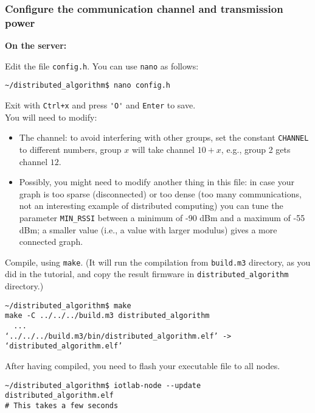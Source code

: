 \documentclass[oneside]{article}
\begin{document}
\subsubsection{Configure the communication channel and transmission power}
\label{subsec:config.h}

\textbf{On the server:}

Edit the file  \verb=config.h=. 
You can use \verb=nano= as follows:
    \begin{verbatim}~/distributed_algorithm$ nano config.h \end{verbatim}
Exit with \verb=Ctrl+x= and  press \verb='O'= and \verb=Enter= to save.\\
    
You will need to modify:
		\begin{itemize}
		\item The channel: to avoid interfering with other groups, set the
            constant \verb=CHANNEL= to different numbers, group $x$ will 					take channel $10+x$, e.g., group 2 gets channel $12$.
		\item Possibly, you might  need to modify another thing in this file:
		in case your graph is too sparse (disconnected) 
		or too dense (too many communications, 
		not an interesting example of distributed computing)
		you can tune the parameter \verb=MIN_RSSI=
		between a minimum of -90 dBm and a maximum of -55 dBm; 
		a smaller value (i.e., a value with larger modulus) gives a more connected graph.
        \end{itemize}

Compile, using \verb=make=.
    (It will run the compilation from \verb=build.m3= directory, as you did in the tutorial, and copy the result firmware in \verb=distributed_algorithm= directory.)
    \begin{verbatim}~/distributed_algorithm$ make
make -C ../../../build.m3 distributed_algorithm
  ...
‘../../../build.m3/bin/distributed_algorithm.elf’ -> ‘distributed_algorithm.elf’
\end{verbatim}

After having compiled, you need to flash your executable file to all nodes.
    \begin{verbatim}~/distributed_algorithm$ iotlab-node --update distributed_algorithm.elf
# This takes a few seconds
\end{verbatim}
\end{document}
